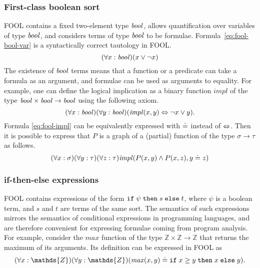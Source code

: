 \documentclass{easychair}
\begin{document}
\subsubsection{First-class boolean sort}
FOOL contains a fixed two-element type $\mathit{bool}$, allows quantification over 
variables of type $\mathit{bool}$, and considers terms of type $\mathit{bool}$ to be formulae. 
Formula~\ref{eq:fool-bool-var} is a syntactically correct tautology in FOOL.
\begin{equation}\label{eq:fool-bool-var}
(\forall x:\mathit{bool})(x \lor \neg x)
\end{equation}
The existence of $\mathit{bool}$ terms means that a function or a predicate can take 
a formula as an argument, and formulae can be used as arguments to equality.
For example, one can define the logical implication as a binary function
$\mathit{impl}$ of the type $\mathit{bool} \times \mathit{bool} \to \mathit{bool}$ using the following
axiom.
\begin{equation}\label{eq:fool-impl}
(\forall x:\mathit{bool})(\forall y:\mathit{bool})(\mathit{impl}(x,y) \Leftrightarrow \neg x \lor y).
\end{equation}
Formula \ref{eq:fool-impl} can be equivalently expressed with $\doteq$ instead of
$\Leftrightarrow$.
Then it is possible to express that $P$ is a graph of a (partial) function of 
the type $\sigma \to \tau$ as follows.
\begin{equation}\label{eq:bool-arg-example}
(\forall x:\sigma)(\forall y:\tau)(\forall z:\tau)
\mathit{impl}(P(x,y) \land P(x,z), y \doteq z)
\end{equation}

\subsubsection{if-then-else expressions}
FOOL contains expressions of the form $\mathtt{if}\;{\psi}\;\allowbreak\mathtt{then}\;{s}\;\allowbreak\mathtt{else}\;{t}$, where $\psi$ is a
boolean term, and $s$ and $t$ are terms of the same sort. 
The semantics of such expressions mirrors the semantics of conditional 
expressions in programming languages, and are therefore convenient for 
expressing formulae coming from program analysis. 
For example, consider the $\mathit{max}$ function of the type 
$\mathds{Z}\times\mathds{Z}\to\mathds{Z}$ that returns the maximum of its 
arguments. 
Its definition can be expressed in FOOL as
\begin{equation}\label{eq:ite-t-example}
(\forall x:\mathds{Z})(\forall y:\mathds{Z})
(\mathit{max}(x, y) \eql \ite{x \geq y}{x}{y}).
\end{equation}
\end{document}

